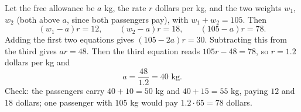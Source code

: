 Let the free allowance be $a$ kg, the rate $r$ dollars per kg, and the two weights $w_1$, $w_2$ (both above $a$, since both passengers pay), with $w_1+w_2=105$. Then
\[
(w_1-a)r=12,\qquad (w_2-a)r=18,\qquad (105-a)r=78 .
\]
Adding the first two equations gives $(105-2a)r=30$. Subtracting this from the third gives $ar=48$. Then the third equation reads $105r-48=78$, so $r=1.2$ dollars per kg and
\[
a=\dfrac{48}{1.2}=\boxed{40\text{ kg}}.
\]
Check: the passengers carry $40+10=50$ kg and $40+15=55$ kg, paying $12$ and $18$ dollars; one passenger with $105$ kg would pay $1.2\cdot65=78$ dollars.
